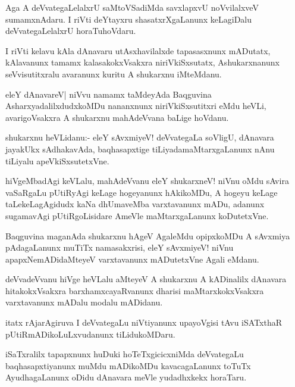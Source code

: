 \documentclass{article}
\begin{document}
\begin{mn}%
Aga A deVvategaLelalxrU saMtoVSadiMda savxlapxvU noVvilalxveV
sumamxnAdaru. I riVti deYtayxru shasatxrXgaLanunx keLagiDalu
deVvategaLelalxrU horaTuhoVdaru.
\end{mn}

\begin{mn}
I riVti kelavu kAla dAnavaru utAsxhavilalxde tapasasxnunx mADutatx,
kAlavanunx tamamx kalasakokxVsakxra niriVkiSxsutatx, Ashukarxnanunx
seVvisutitxralu avaranunx kuritu A shukarxnu iMteMdanu.
\end{mn}

\begin{mn}%
eleY dAnavareV| niVvu namamx taMdeyAda Baqguvina
AsharxyadalilxdudxkoMDu nananxnunx niriVkiSxsutitxri eMdu heVLi,
avarigoVsakxra A shukarxnu mahAdeVvana baLige hoVdanu.
\end{mn}

\begin{mn}
shukarxnu heVLidanu:- eleY sAvxmiyeV! deVvategaLa soVligU, dAnavara
jayakUkx sAdhakavAda, baqhasapxtige tiLiyadamaMtarxgaLanunx nAnu
tiLiyalu apeVkiSxsutetxVne.
\end{mn}

\begin{mn}
hiVgeMbadAgi keVLalu, mahAdeVvanu eleY shukarxneV! niVnu oMdu sAvira
vaSaRgaLu pUtiRyAgi keLage hogeyanunx hAkikoMDu, A hogeyu keLage
taLekeLagAgidudx kaNa dhUmaveMba varxtavanunx mADu, adanunx sugamavAgi
pUtiRgoLisidare AmeVle maMtarxgaLanunx koDutetxVne.
\end{mn}

\begin{mn}%
Baqguvina maganAda shukarxnu hAgeV AgaleMdu opipxkoMDu A sAvxmiya
pAdagaLanunx muTiTx namasakxrisi, eleY sAvxmiyeV! niVnu
apapxNemADidaMteyeV varxtavanunx mADutetxVne Agali eMdanu.
\end{mn}

\begin{mn}
deVvadeVvanu hiVge heVLalu aMteyeV A shukarxnu A kADinalilx dAnavara
hitakokxVsakxra barxhamxcayaRvanunx dharisi maMtarxkokxVsakxra
varxtavanunx mADalu modalu mADidanu.
\end{mn}

\begin{mn}
itatx rAjarAgiruva I deVvategaLu niVtiyanunx upayoVgisi tAvu iSATxthaR
pUtiRmADikoLuLxvudanunx tiLidukoMDaru.
\end{mn}

\begin{mn}
iSaTxralilx tapapxnunx huDuki hoTeTxgicicxniMda deVvategaLu
baqhasapxtiyanunx muMdu mADikoMDu kavacagaLanunx toTuTx AyudhagaLanunx
oDidu dAnavara meVle yudadhxkekx horaTaru.
\end{mn}
\end{document}
